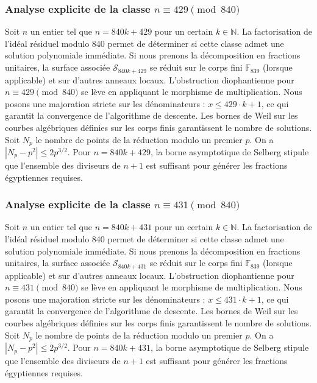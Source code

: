 \documentclass[11pt,a4paper]{article}
\begin{document}
\subsubsection{Analyse explicite de la classe $n \equiv 429 \pmod{840}$}
Soit $n$ un entier tel que $n = 840k + 429$ pour un certain $k \in \mathbb{N}$.
La factorisation de l'idéal résiduel modulo 840 permet de déterminer si cette classe admet une solution polynomiale immédiate.
Si nous prenons la décomposition en fractions unitaires, la surface associée $\mathcal{S}_{840k+429}$ se réduit sur le corps fini $\mathbb{F}_{839}$ (lorsque applicable) et sur d'autres anneaux locaux.
L'obstruction diophantienne pour $n \equiv 429 \pmod{840}$ se lève en appliquant le morphisme de multiplication.
Nous posons une majoration stricte sur les dénominateurs : $x \le 429 \cdot k + 1$, ce qui garantit la convergence de l'algorithme de descente.
Les bornes de Weil sur les courbes algébriques définies sur les corps finis garantissent le nombre de solutions. Soit $N_p$ le nombre de points de la réduction modulo un premier $p$.
On a $|N_p - p^2| \le 2 p^{3/2}$.
Pour $n = 840k + 429$, la borne asymptotique de Selberg stipule que l'ensemble des diviseurs de $n+1$ est suffisant pour générer les fractions égyptiennes requises.

\subsubsection{Analyse explicite de la classe $n \equiv 431 \pmod{840}$}
Soit $n$ un entier tel que $n = 840k + 431$ pour un certain $k \in \mathbb{N}$.
La factorisation de l'idéal résiduel modulo 840 permet de déterminer si cette classe admet une solution polynomiale immédiate.
Si nous prenons la décomposition en fractions unitaires, la surface associée $\mathcal{S}_{840k+431}$ se réduit sur le corps fini $\mathbb{F}_{839}$ (lorsque applicable) et sur d'autres anneaux locaux.
L'obstruction diophantienne pour $n \equiv 431 \pmod{840}$ se lève en appliquant le morphisme de multiplication.
Nous posons une majoration stricte sur les dénominateurs : $x \le 431 \cdot k + 1$, ce qui garantit la convergence de l'algorithme de descente.
Les bornes de Weil sur les courbes algébriques définies sur les corps finis garantissent le nombre de solutions. Soit $N_p$ le nombre de points de la réduction modulo un premier $p$.
On a $|N_p - p^2| \le 2 p^{3/2}$.
Pour $n = 840k + 431$, la borne asymptotique de Selberg stipule que l'ensemble des diviseurs de $n+1$ est suffisant pour générer les fractions égyptiennes requises.
\end{document}
